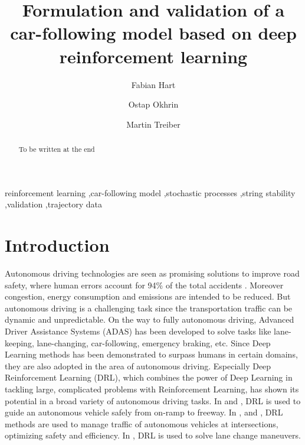 \documentclass[review]{elsarticle}
\begin{document}
\begin{frontmatter}

\title{Formulation and validation of a car-following model based on deep
  reinforcement learning}


\author[firstAddress]{Fabian Hart}
\author[firstAddress,secondAddress]{Ostap Okhrin}
\author[firstAddress,secondAddress]{Martin Treiber}

\address[firstAddress]{TU Dresden}
\address[secondAddress]{Possible second address}




\begin{abstract}
To be written at the end
\end{abstract}

\begin{keyword}
reinforcement learning \sep car-following model \sep stochastic
processes \sep string stability \sep validation \sep trajectory data 
\end{keyword}

\end{frontmatter}


\section{Introduction}

Autonomous driving technologies are seen as promising solutions to improve road safety, where human errors account for 94\% of the total accidents \cite{vehicleCrashSurvey2015}. Moreover congestion, energy consumption and emissions are intended to be reduced. 
But autonomous driving is a challenging task since the transportation traffic can be dynamic and unpredictable.
On the way to fully autonomous driving, Advanced Driver Assistance Systems
(ADAS) has been developed to solve tasks like lane-keeping, lane-changing, car-following, emergency braking, etc.
Since Deep Learning methods has been demonstrated to surpass humans in certain domains, they are also adopted in the area of autonomous driving.
Especially Deep Reinforcement Learning (DRL), which combines the power of Deep Learning in tackling large, complicated problems with Reinforcement Learning, has shown its potential in a broad variety of autonomous driving tasks. 
In \cite{OnRampMerge2018} and \cite{OnRampMerge2020}, DRL is used to guide an autonomous vehicle safely from on-ramp to freeway. In \cite{intersection1}, \cite{intersection3} and \cite{intersection2}, DRL methods are used to manage traffic of autonomous vehicles at intersections, optimizing safety and efficiency.
In \cite{LangeChange1}, DRL is used to solve lane change maneuvers.
\end{document}
